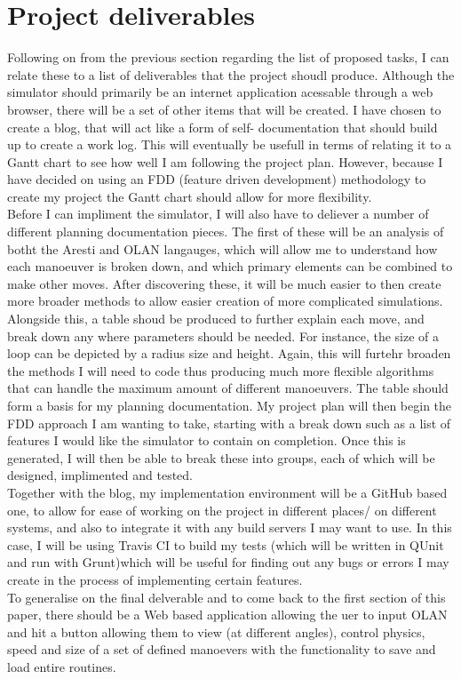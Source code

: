 \documentclass[11pt,fleqn,twoside]{article}
\begin{document}
\section{Project deliverables}
Following on from the previous section regarding the list of proposed tasks, I can relate these to a list of deliverables that the project shoudl produce. Although the simulator should primarily be an internet application acessable through a web browser, there will be a set of other items that will be created. I have chosen to create a blog, that will act like a form of self- documentation that should build up to create a work log. This will eventually be usefull in terms of relating it to a Gantt chart to see how well I am following the project plan. However, because I have decided on using an FDD (feature driven development) methodology to create my project the Gantt chart should allow for more flexibility. \\
Before I can impliment the simulator, I will also have to deliever a number of different planning documentation pieces. The first of these will be an analysis of botht the Aresti and OLAN langauges, which will allow me to understand how each manoeuver is broken down, and which primary elements can be combined to make other moves. After discovering these, it will be much easier to then create more broader methods to allow easier creation of more complicated simulations. \\
Alongside this, a table shoud be produced to further explain each move, and break down any where parameters should be needed. For instance, the size of a loop can be depicted by a radius size and height. Again, this will furtehr broaden the methods I will need to code thus producing much more flexible algorithms that can handle the maximum amount of different manoeuvers. The table should form a basis for my planning documentation. My project plan will then begin the FDD approach I am wanting to take, starting with a break down such as a list of features I would like the simulator to contain on completion. Once this is generated, I will then be able to break these into groups, each of which will be designed, implimented and tested.\\
Together with the blog, my implementation environment will be a GitHub based one, to allow for ease of working on the project in different places/ on different systems, and also to integrate it with any build servers I may want to use. In this case, I will be using Travis CI to build my tests (which will be written in QUnit and run with Grunt)which will be useful for finding out any bugs or errors I may create in the process of implementing certain features.\\
To generalise on the final delverable and to come back to the first section of this paper, there should be a Web based application allowing the uer to input OLAN and hit a button allowing them to view (at different angles), control physics, speed and size of a set of defined manoevers with the functionality to save and load entire routines.
\end{document}
